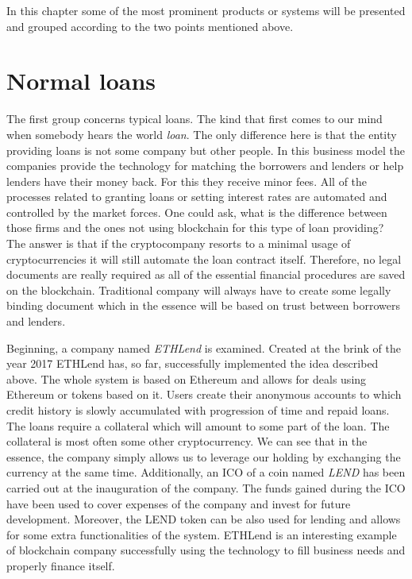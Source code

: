 \documentclass[a4paper,12pt,twoside,openany]{report}
\begin{document}
In this chapter some of the most prominent products or systems will be presented and grouped according to the two points mentioned above.

\section{Normal loans}
The first group concerns typical loans. The kind that first comes to our mind when somebody hears the world \textit{loan}. The only difference here is that the entity providing loans is not some company but other people.  In this business model the companies provide the technology for matching the borrowers and lenders or help lenders have their money back. For this they receive minor fees. All of the processes related to granting loans or setting interest rates are automated and controlled by the market forces.
One could ask, what is the difference between those firms and the ones not using blockchain for this type of loan providing? The answer is that if the cryptocompany resorts to a minimal usage of cryptocurrencies it will still automate the loan contract itself. Therefore, no legal documents are really required as all of the essential financial procedures are saved on the blockchain. Traditional company will always have to create some legally binding document which in the essence will be based on trust between borrowers and lenders.

Beginning, a company named \textit{ETHLend} \cite{ethlend} is examined. Created at the brink of the year 2017 ETHLend has, so far, successfully implemented the idea described above. The whole system is based on Ethereum and allows for deals using Ethereum or tokens based on it. Users create their anonymous accounts to which credit history is slowly accumulated with progression of time and repaid loans. The loans require a collateral which will amount to some part of the loan. The collateral is most often some other cryptocurrency. We can see that in the essence, the company simply allows us to leverage our holding by exchanging the currency at the same time. Additionally, an ICO of a coin named \textit{LEND} has been carried out at the inauguration of the company. The funds gained during the ICO have been used to cover expenses of the company and invest for future development. Moreover, the LEND token can be also used for lending and allows for some extra functionalities of the system. ETHLend is an interesting example of blockchain company successfully using the technology to fill business needs and properly finance itself.
\end{document}
